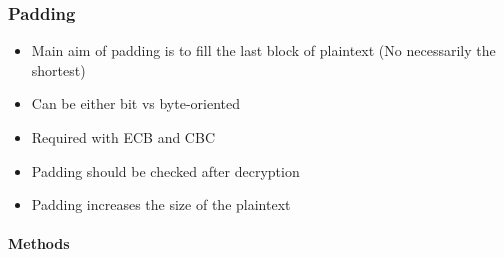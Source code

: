 \subsubsection{Padding}
\begin{itemize}
    \item Main aim of padding is to fill the last block of plaintext (No
        necessarily the shortest)
    \item Can be either bit vs byte-oriented
    \item Required with ECB and CBC
    \item Padding should be checked after decryption
    \item Padding increases the size of the plaintext
\end{itemize}

\paragraph{Methods}

